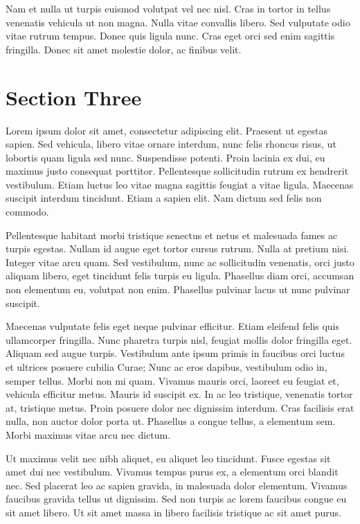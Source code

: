 \documentclass[runningheads,a4paper]{llncs}
\begin{document}
Nam et nulla ut turpis euismod volutpat vel nec nisl. Cras in tortor in tellus venenatis vehicula ut non magna. Nulla vitae convallis libero. Sed vulputate odio vitae rutrum tempus. Donec quis ligula nunc. Cras eget orci sed enim sagittis fringilla. Donec sit amet molestie dolor, ac finibus velit.
%
\newpage
%
\section{Section Three}
%
Lorem ipsum dolor sit amet, consectetur adipiscing elit. Praesent ut egestas sapien. Sed vehicula, libero vitae ornare interdum, nunc felis rhoncus risus, ut lobortis quam ligula sed nunc. Suspendisse potenti. Proin lacinia ex dui, eu maximus justo consequat porttitor. Pellentesque sollicitudin rutrum ex hendrerit vestibulum. Etiam luctus leo vitae magna sagittis feugiat a vitae ligula. Maecenas suscipit interdum tincidunt. Etiam a sapien elit. Nam dictum sed felis non commodo.

Pellentesque habitant morbi tristique senectus et netus et malesuada fames ac turpis egestas. Nullam id augue eget tortor cursus rutrum. Nulla at pretium nisi. Integer vitae arcu quam. Sed vestibulum, nunc ac sollicitudin venenatis, orci justo aliquam libero, eget tincidunt felis turpis eu ligula. Phasellus diam orci, accumsan non elementum eu, volutpat non enim. Phasellus pulvinar lacus ut nunc pulvinar suscipit.

Maecenas vulputate felis eget neque pulvinar efficitur. Etiam eleifend felis quis ullamcorper fringilla. Nunc pharetra turpis nisl, feugiat mollis dolor fringilla eget. Aliquam sed augue turpis. Vestibulum ante ipsum primis in faucibus orci luctus et ultrices posuere cubilia Curae; Nunc ac eros dapibus, vestibulum odio in, semper tellus. Morbi non mi quam. Vivamus mauris orci, laoreet eu feugiat et, vehicula efficitur metus. Mauris id suscipit ex. In ac leo tristique, venenatis tortor at, tristique metus. Proin posuere dolor nec dignissim interdum. Cras facilisis erat nulla, non auctor dolor porta ut. Phasellus a congue tellus, a elementum sem. Morbi maximus vitae arcu nec dictum.

Ut maximus velit nec nibh aliquet, eu aliquet leo tincidunt. Fusce egestas sit amet dui nec vestibulum. Vivamus tempus purus ex, a elementum orci blandit nec. Sed placerat leo ac sapien gravida, in malesuada dolor elementum. Vivamus faucibus gravida tellus ut dignissim. Sed non turpis ac lorem faucibus congue eu sit amet libero. Ut sit amet massa in libero facilisis tristique ac sit amet purus.
\end{document}
